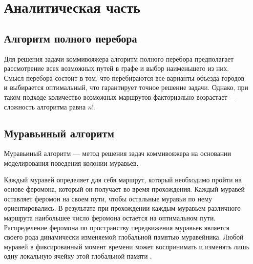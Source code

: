 \section{Аналитическая часть}

\subsection{Алгоритм полного перебора}

Для решения задачи коммивояжера алгоритм полного перебора предполагает рассмотрение всех возможных путей в графе и выбор наименьшего из них. 
Смысл перебора состоит в том, что перебираются все варианты объезда городов и выбирается оптимальный, что гарантирует точное решение задачи. 
Однако, при таком подходе количество возможных маршрутов факториально возрастает --- сложность алгоритма равна $n!$.


\subsection{Муравьиный алгоритм}
Муравьиный алгоритм --- метод решения задач коммивояжера на основании моделирования поведения колонии муравьев.

Каждый муравей определяет для себя маршрут, который необходимо пройти на основе феромона, который он получает во время прохождения. Каждый муравей оставляет феромон на своем пути, чтобы остальные муравьи по нему ориентировались. 
В результате при прохождении каждым муравьем различного маршрута наибольшее число феромона остается на оптимальном пути.
Распределение феромона по пространству передвижения муравьев является своего рода динамически изменяемой глобальной памятью муравейника. 
Любой муравей в фиксированный момент времени может воспринимать и изменять лишь одну локальную ячейку этой глобальной памяти \cite{штовба2003муравьиные}.

